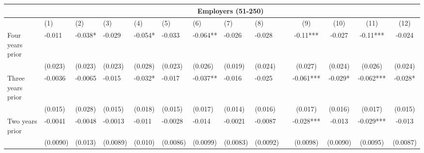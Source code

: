 \begin{tabular}{lccccrrrrrcccc}
\toprule
      & \multicolumn{13}{c}{Employers (51-250)} \\
\midrule
      & \multicolumn{1}{l}{(1)} & \multicolumn{1}{l}{(2)} & \multicolumn{1}{l}{(3)} & \multicolumn{1}{l}{(4)} & \multicolumn{1}{l}{(5)} & \multicolumn{1}{l}{(6)} & \multicolumn{1}{l}{(7)} & \multicolumn{1}{l}{(8)} &       & (9)   & (10)  & (11)  & (12) \\
\midrule
\midrule
Four years prior & \multicolumn{1}{l}{-0.011} & \multicolumn{1}{l}{-0.038*} & \multicolumn{1}{l}{-0.029} & \multicolumn{1}{l}{-0.054*} & \multicolumn{1}{l}{-0.033} & \multicolumn{1}{l}{-0.064**} & \multicolumn{1}{l}{-0.026} & \multicolumn{1}{l}{-0.028} &       & -0.11*** & -0.027 & -0.11*** & -0.024 \\
      & \multicolumn{1}{l}{(0.023)} & \multicolumn{1}{l}{(0.023)} & \multicolumn{1}{l}{(0.023)} & \multicolumn{1}{l}{(0.028)} & \multicolumn{1}{l}{(0.023)} & \multicolumn{1}{l}{(0.026)} & \multicolumn{1}{l}{(0.019)} & \multicolumn{1}{l}{(0.024)} &       & (0.027) & (0.024) & (0.026) & (0.024) \\
Three years prior & \multicolumn{1}{l}{-0.0036} & \multicolumn{1}{l}{-0.0065} & \multicolumn{1}{l}{-0.015} & \multicolumn{1}{l}{-0.032*} & \multicolumn{1}{l}{-0.017} & \multicolumn{1}{l}{-0.037**} & \multicolumn{1}{l}{-0.016} & \multicolumn{1}{l}{-0.025} &       & -0.061*** & -0.029* & -0.062*** & -0.028* \\
      & \multicolumn{1}{l}{(0.015)} & \multicolumn{1}{l}{(0.028)} & \multicolumn{1}{l}{(0.015)} & \multicolumn{1}{l}{(0.018)} & \multicolumn{1}{l}{(0.015)} & \multicolumn{1}{l}{(0.017)} & \multicolumn{1}{l}{(0.014)} & \multicolumn{1}{l}{(0.016)} &       & (0.017) & (0.016) & (0.017) & (0.015) \\
Two years prior & \multicolumn{1}{l}{-0.0041} & \multicolumn{1}{l}{-0.0048} & \multicolumn{1}{l}{-0.0013} & \multicolumn{1}{l}{-0.011} & \multicolumn{1}{l}{-0.0028} & \multicolumn{1}{l}{-0.014} & \multicolumn{1}{l}{-0.0021} & \multicolumn{1}{l}{-0.0087} &       & -0.028*** & -0.013 & -0.029*** & -0.013 \\
      & \multicolumn{1}{l}{(0.0090)} & \multicolumn{1}{l}{(0.013)} & \multicolumn{1}{l}{(0.0089)} & \multicolumn{1}{l}{(0.010)} & \multicolumn{1}{l}{(0.0086)} & \multicolumn{1}{l}{(0.0099)} & \multicolumn{1}{l}{(0.0083)} & \multicolumn{1}{l}{(0.0092)} &       & (0.0098) & (0.0090) & (0.0095) & (0.0087) \\

\end{tabular}
